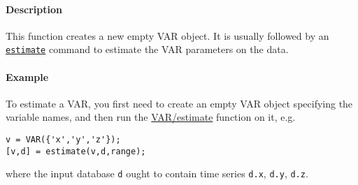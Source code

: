 \paragraph{Description}

This function creates a new empty VAR object. It is usually followed by
an \href{VAR/estimate}{\texttt{estimate}} command to estimate the VAR
parameters on the data.

\paragraph{Example}

To estimate a VAR, you first need to create an empty VAR object
specifying the variable names, and then run the \url{VAR/estimate}
function on it, e.g.

\begin{verbatim}
v = VAR({'x','y','z'});
[v,d] = estimate(v,d,range);
\end{verbatim}

where the input database \texttt{d} ought to contain time series
\texttt{d.x}, \texttt{d.y}, \texttt{d.z}.


